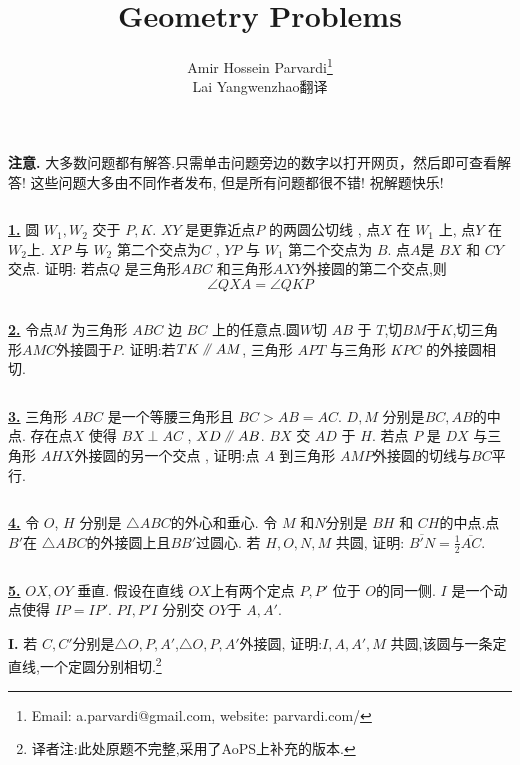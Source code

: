 \documentclass{article}
\newcommand{\equal}{=}
\newcommand\pxx{%
\mathrel{\text{\tikz[baseline] \draw (0em,-0.3ex) -- (.4em,1.7ex) (.2em,-0.3ex) -- (.6em,1.7ex);}%
}}
\begin{document}
\title{Geometry Problems}\author{Amir Hossein Parvardi\thanks{ Email: a.parvardi@gmail.com, website: parvardi.com/ }\\Lai Yangwenzhao翻译} \maketitle

\par {\bf 注意.} 大多数问题都有解答.只需单击问题旁边的数字以打开网页，然后即可查看解答! 这些问题大多由不同作者发布, 但是所有问题都很不错! 祝解题快乐!

$$ $$

\href{http://www.artofproblemsolving.com/Forum/viewtopic.php?p=1899886#p1899886}{\bf 1.} 圆 $W_1,W_2$ 交于 $P,K$. $XY$ 是更靠近点$P$ 的两圆公切线 , 点$X$ 在 $W_1$ 上, 点$Y$ 在 $W_2$上. $XP$ 与 $W_2$ 第二个交点为$C$ , $YP$ 与 $W_1$ 第二个交点为 $B$. 点$A$是 $BX$ 和 $CY$交点. 证明: 若点$Q$ 是三角形$ABC$ 和三角形$AXY$外接圆的第二个交点,则
$$\angle QXA=\angle QKP$$

$$ $$

\href{http://www.artofproblemsolving.com/Forum/viewtopic.php?p=1899885#p1899885}{\bf 2.} 令点$M$ 为三角形 $ABC$ 边 $BC$ 上的任意点.圆$W$切 $AB$ 于 $T$,切$BM$于$K$,切三角形$AMC$外接圆于$P$. 证明:若$TK\pxx AM$, 三角形 $APT$ 与三角形 $KPC$ 的外接圆相切.

$$ $$

\href{http://www.artofproblemsolving.com/Forum/viewtopic.php?p=1871430#p1871430}{\bf 3.} 三角形 $ABC$ 是一个等腰三角形且 $BC>AB=AC$. $D,M$ 分别是$BC, AB$的中点. 存在点$X$ 使得 $BX\perp AC$ , $XD\pxx AB$. $BX$ 交 $AD$ 于 $H$. 若点 $P$ 是 $DX$ 与三角形 $AHX$外接圆的另一个交点 , 证明:点 $A$ 到三角形 $AMP$外接圆的切线与$BC$平行.

$$ $$

\href{http://www.artofproblemsolving.com/Forum/viewtopic.php?p=1871420#p1871420}{\bf 4.} 令 $O$, $H$ 分别是 $\triangle ABC$的外心和垂心. 令 $M$ 和$N$分别是 $BH$ 和 $CH$的中点.点$B'$在 $\triangle ABC$的外接圆上且$BB'$过圆心. 若 $H,O,N,M$ 共圆, 证明: $\displaystyle\overline{B'N}=\frac12\overline{AC}$.

$$ $$

\href{http://www.artofproblemsolving.com/Forum/viewtopic.php?p=1385942#p1385942}{\bf 5.} $ OX,OY$ 垂直. 假设在直线 $ OX$上有两个定点 $ P,P'$ 位于 $ O$的同一侧. $ I$ 是一个动点使得 $ IP\equal{}IP'$. $ PI,P'I$ 分别交 $ OY$于 $ A,A'$.

{\bf I.} 若 $ C,C'$分别是$\triangle O,P,A'$,$\triangle O,P,A'$外接圆, 证明:$ I,A,A',M$ 共圆,该圆与一条定直线,一个定圆分别相切.\footnote{译者注:此处原题不完整,采用了AoPS上补充的版本.}
\end{document}

